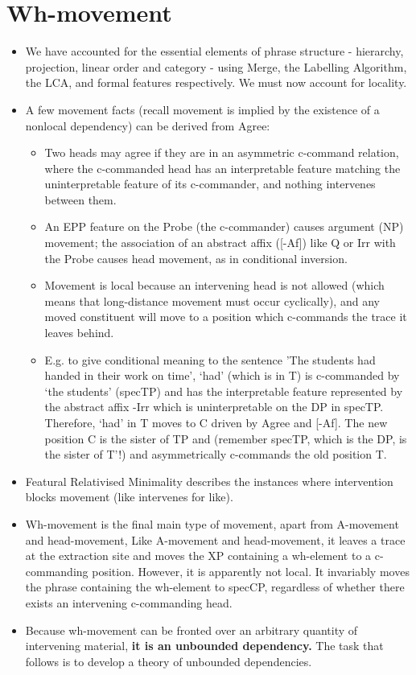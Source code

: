 \documentclass{article}
\begin{document}
\section{Wh-movement}
\begin{itemize}
    \item We have accounted for the essential elements of phrase structure - hierarchy, projection, linear order and category - using Merge, the Labelling Algorithm, the LCA, and formal features respectively. We must now account for locality.
    \item A few movement facts (recall movement is implied by the existence of a nonlocal dependency) can be derived from Agree:
    \begin{itemize}
        \item Two heads may agree if they are in an asymmetric c-command relation, where the c-commanded head has an interpretable feature matching the uninterpretable feature of its c-commander, and nothing intervenes between them.
        \item An EPP feature on the Probe (the c-commander) causes argument (NP) movement; the association of an abstract affix ([-Af]) like Q or Irr with the Probe causes head movement, as in conditional inversion.
        \item Movement is local because an intervening head is not allowed (which means that long-distance movement must occur cyclically), and any moved constituent will move to a position which c-commands the trace it leaves behind.
        \item E.g. to give conditional meaning to the  sentence 'The students had handed in their work on time', `had' (which is in T) is c-commanded by `the students' (specTP) and has the interpretable feature represented by the abstract affix -Irr which is uninterpretable on the DP in specTP. Therefore, `had' in T moves to C driven by Agree and [-Af]. The new position C is the sister of TP and (remember specTP, which is the DP, is the sister of T'!) and asymmetrically c-commands the old position T.
    \end{itemize}
    \item Featural Relativised Minimality describes the instances where intervention blocks movement (like intervenes for like).
    \item Wh-movement is the final main type of movement, apart from A-movement and head-movement, Like A-movement and head-movement, it leaves a trace at the extraction site and moves the XP containing a wh-element to a c-commanding position. However, it is apparently not local. It invariably moves the phrase containing the wh-element to specCP, regardless of whether there exists an intervening c-commanding head.
    \item Because wh-movement can be fronted over an arbitrary quantity of intervening material, \textbf{it is an unbounded dependency.} The task that follows is to develop a theory of unbounded dependencies.

\end{itemize}
\end{document}
